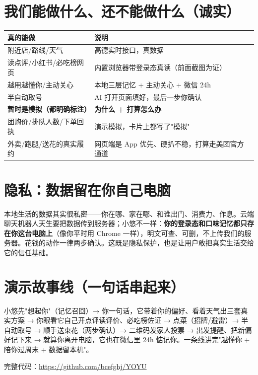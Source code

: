 \documentclass[11pt,a4paper]{ctexart}
\begin{document}
\section{我们能做什么、还不能做什么（诚实）}
\begin{center}
{\small
\begin{tabularx}{\linewidth}{>{\raggedright\arraybackslash}p{4.3cm} >{\raggedright\arraybackslash}X}
\toprule
\textbf{真的能做} & \textbf{说明} \\
\midrule
附近店/路线/天气 & 高德实时接口，真数据 \\
读点评/小红书/必吃榜网页 & 内置浏览器带登录态真读（前面截图为证） \\
越用越懂你/主动关心 & 本地三层记忆 + 主动关心 + 微信 24h \\
半自动取号 & AI 打开页面填好，最后一步你确认 \\
\midrule
\textbf{暂时是模拟（都明确标注）} & \textbf{为什么 + 打算怎么办} \\
\midrule
团购价/排队人数/下单回执 & 演示模拟，卡片上都写了"模拟" \\
外卖/跑腿/送花的真实履约 & 网页端是 App 优先、硬扒不稳，打算走美团官方通道 \\
\bottomrule
\end{tabularx}}
\end{center}

\section{隐私：数据留在你自己电脑}
本地生活的数据其实很私密——你在哪、家在哪、和谁出门、消费力、作息。云端聊天机器人天生要把数据传到服务器；小悠不一样：\textbf{你的登录态和口味记忆都只存在你这台电脑上}（像你平时用 Chrome 一样），明文可查、可删，不上传我们的服务器。花钱的动作一律两步确认。这既是隐私保护，也是让用户敢把真实生活交给它的信任基础。

\section{演示故事线（一句话串起来）}
小悠先"想起你"（记忆召回）→ 你一句话，它带着你的偏好、看着天气出三套真实方案 → 你眼看它自己开点评读评价、必吃榜佐证 → 点菜（招牌/避雷）→ 半自动取号 → 顺手送束花（两步确认）→ 二维码发家人投票 → 出发提醒、把新偏好记下来 → 就算你离开电脑，它也在微信里 24h 惦记你。一条线讲完"越懂你 + 陪你过周末 + 数据留本机"。

\vspace{0.3cm}
\begin{center}\small 完整代码：\url{https://github.com/bcefghj/YOYU}\end{center}
\end{document}
